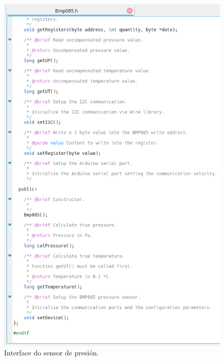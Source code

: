    \begin{figure}[htbp]
    \centering
    \includegraphics[scale=0.8,keepaspectratio=true]{./imagenes/interface-sensor-presion.png}
    \caption{Interface do sensor de presión.}
    \label{figura:InterfaceSensorPresion}
   \end{figure}
   
